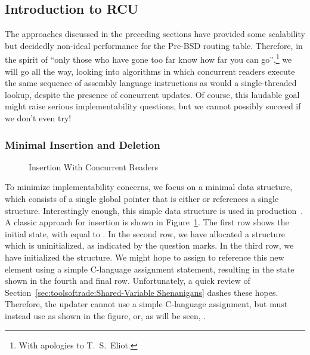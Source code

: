 
\subsection{Introduction to RCU}
\label{sec:defer:Introduction to RCU}

The approaches discussed in the preceding sections have provided
some scalability but decidedly non-ideal performance for the
Pre-BSD routing table.
Therefore, in the spirit of ``only those who have gone too far
know how far you can go'',\footnote{
	With apologies to T.~S.~Eliot.}
we will go all the way, looking into algorithms in which concurrent
readers execute the same sequence of assembly language instructions as
would a single-threaded lookup, despite the presence of concurrent
updates.
Of course, this laudable goal might raise serious implementability
questions, but we cannot possibly succeed if we don't even try!

\subsubsection{Minimal Insertion and Deletion}
\label{sec:defer:Minimal Insertion and Deletion}

\begin{figure}[tb]
\centering
{}
\caption{Insertion With Concurrent Readers}
\label{fig:defer:Insertion With Concurrent Readers}
\end{figure}

To minimize implementability concerns, we focus on a minimal
data structure, which consists of a single global pointer that is either
 or references a single structure.
Interestingly enough, this simple data structure is used in
production~\cite{GeoffRomer2018C++DeferredReclamationP0561R4}.
A classic approach for insertion is shown in
Figure~\ref{fig:defer:Insertion With Concurrent Readers}.
The first row shows the initial state, with  equal to .
In the second row, we have allocated a structure which is uninitialized,
as indicated by the question marks.
In the third row, we have initialized the structure.
We might hope to assign  to reference this new element
using a simple C-language assignment statement, resulting in the
state shown in the fourth and final row.
Unfortunately, a quick review of
Section~\ref{sec:toolsoftrade:Shared-Variable Shenanigans}
dashes these hopes.
Therefore, the updater cannot use a simple C-language assignment, but
must instead use  as shown in the figure,
or, as will be seen, .

